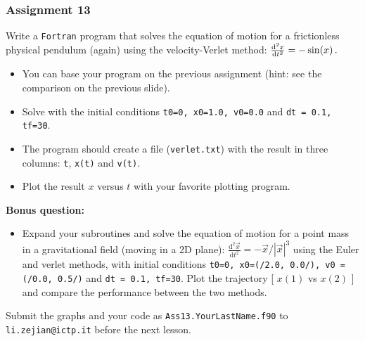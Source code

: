 \documentclass[11pt,aspectratio=169,handout]{beamer}
\begin{document}
\begin{frame}
\frametitle{Assignment 13}
Write a \texttt{Fortran} program that solves the equation of motion for a frictionless physical pendulum (again) using the velocity-Verlet method: $\frac{{\rm {d}}^2 x}{{\rm {d}} t^2} = -\sin(x)\,.$

\pause
\begin{itemize}
	\item You can base your program on the previous assignment (hint: see the comparison on the previous slide).
	\item Solve with the initial conditions \texttt{t0=0, x0=1.0, v0=0.0} and \texttt{dt = 0.1, tf=30}.
	\item The program should create a file (\texttt{verlet.txt}) with the result in three columns: \texttt{t}, \texttt{x(t)} and \texttt{v(t)}.\pause
	\item Plot the result $x$ versus $t$ with your favorite plotting program.\pause
\end{itemize}
\textbf{Bonus question:}
\begin{itemize}
	\item Expand your subroutines and solve the equation of motion for a point mass in a gravitational field (moving in a 2D plane): $\frac{\mathrm{d}^2 \vec{x}}{\mathrm{d} t^2} = -\vec{x}/|\vec{x}|^3$ using the Euler and verlet methods, with initial conditions \texttt{t0=0, x0=(/2.0, 0.0/),  v0 = (/0.0, 0.5/)} and \texttt{dt = 0.1, tf=30}. Plot the trajectory [ $x(1)$ vs $x(2)$ ] and compare the performance between the two methods.
\end{itemize}
Submit the graphs and your code as \texttt{Ass13.YourLastName.f90} to \texttt{li.zejian@ictp.it} before the next lesson.
\end{frame}
\end{document}
